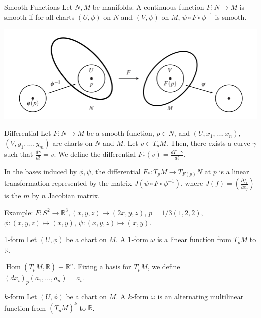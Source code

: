 \documentclass[9pt]{beamer}
\DeclareMathOperator{\Hom}{Hom}
\begin{document}
\begin{frame}
    \begin{block}{Smooth Functions}
        Let $N,M$ be manifolds. A continuous function $F:N\rightarrow M$ is smooth if for all charts $(U, \phi)$ on $N$ and $(V, \psi)$ on $M$, $\psi\circ F\circ \phi^{-1}$ is smooth.
    \end{block}
    \includegraphics[scale=0.55]{smooth_function.PNG}
\end{frame}

\begin{frame}{}
    \begin{block}{Differential}
        Let $F: N \rightarrow M$ be a smooth function, $p\in N$, and $(U, x_1,\dots,x_n)$, $(V, y_1,\dots,y_m)$ are charts on $N$ and $M$. Let $v\in T_pM$. Then, there exists a curve $\gamma$ such that $\frac{d \gamma}{d t} = v$. We define the differential $F_*(v)=\frac{d F\circ\gamma}{d t}$.
    \end{block}    

    In the bases induced by $\phi, \psi$, the differential $F_*:T_pM \rightarrow T_{F(p)}N$ at $p$ is a linear transformation represented by the matrix $J(\psi\circ F\circ \phi^{-1})$, where $J(f)=\left(\frac{\partial f_i}{\partial x_j}\right)$ is the $m$ by $n$ Jacobian matrix.
    

    Example: $F:S^2 \rightarrow \mathbb{R}^3, (x,y,z)\mapsto (2x,y,z)$, $p=1/3(1,2,2)$, $\phi:(x,y,z)\mapsto (x,y)$, $\psi:(x,y,z)\mapsto (x,y)$.
\end{frame}

\begin{frame}
    \begin{block}{1-form}
        Let $(U, \phi)$ be a chart on $M$. A 1-form $\omega$ is a linear function from $T_p M$ to $\mathbb{R}$.
    \end{block}
    $\Hom(T_p M, \mathbb{R})\equiv \mathbb{R}^n$. Fixing a basis for $T_pM$, we define $(dx_i)_p(a_1, \dots, a_n) = a_i$.
    \begin{block}{$k$-form}
        Let $(U, \phi)$ be a chart on $M$. A $k$-form $\omega$ is an alternating multilinear function from $(T_p M)^k$ to $\mathbb{R}$.
    \end{block}

\end{frame}
\end{document}

